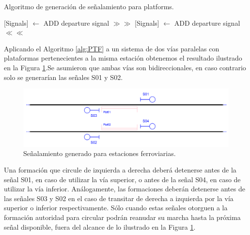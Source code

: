     \begin{algorithm}[H]
        \caption{Algoritmo de generación de señalamiento para platforms.}\label{alg:PTF}
        \DontPrintSemicolon
        \SetNoFillComment
        \LinesNotNumbered 
        {
            [Signals] $\gets$ ADD departure signal $\gg\gg$\;
            [Signals] $\gets$ ADD departure signal $\ll\ll$\;
        }
        \KwResult{[Signals]} 
    \end{algorithm}

    Aplicando el Algoritmo \ref{alg:PTF} a un sistema de dos vías paralelas con plataformas pertenecientes a la misma estación obtenemos el resultado ilustrado en la Figura \ref{fig:signal_platform}.Se asumieron que ambas vías son bidireccionales, en caso contrario solo se generarían las señales S01 y S02.
    
    \begin{figure}[H]
        \centering
        \includegraphics[width=1\textwidth]{Figuras/platforms.PNG}
        \centering\caption{Señalamiento generado para estaciones ferroviarias.}
        \label{fig:signal_platform}
    \end{figure}
    
    Una formación que circule de izquierda a derecha deberá detenerse antes de la señal S01, en caso de utilizar la vía superior, o antes de la señal S04, en caso de utilizar la vía inferior. Análogamente, las formaciones deberán detenerse antes de las señales S03 y S02 en el caso de transitar de derecha a izquierda por la vía superior o inferior respectivamente. Sólo cuando estas señales otorguen a la formación autoridad para circular podrán reanudar su marcha hasta la próxima señal disponible, fuera del alcance de lo ilustrado en la Figura \ref{fig:signal_platform}.